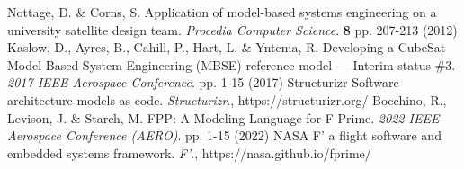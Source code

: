 \begin{thebibliography}{999}
    Nottage, D. \& Corns, S. Application of model-based systems engineering on a university satellite design team. {\em Procedia Computer Science}. \textbf{8} pp. 207-213 (2012)
    Kaslow, D., Ayres, B., Cahill, P., Hart, L. \& Yntema, R. Developing a CubeSat Model-Based System Engineering (MBSE) reference model — Interim status \#3. {\em 2017 IEEE Aerospace Conference}. pp. 1-15 (2017)
    Structurizr Software architecture models as code. {\em Structurizr}., https://structurizr.org/
    Bocchino, R., Levison, J. \& Starch, M. FPP: A Modeling Language for F Prime. {\em 2022 IEEE Aerospace Conference (AERO)}. pp. 1-15 (2022)
    NASA F' a flight software and embedded systems framework. {\em F'}., https://nasa.github.io/fprime/
\end{thebibliography}